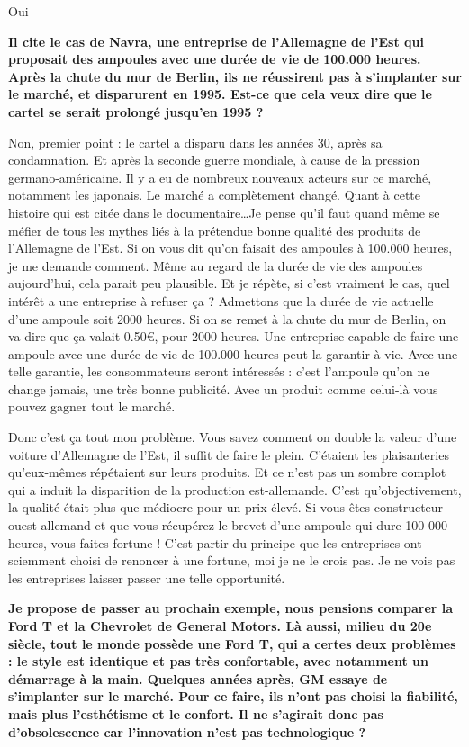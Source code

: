 \begin{small}
Oui

\textbf{Il cite le cas de \og   Navra\fg{}, une entreprise de l'Allemagne de l'Est qui proposait des ampoules avec une durée de vie de 100.000 heures. Après la chute du mur de Berlin, ils ne réussirent pas à s'implanter sur le marché, et disparurent en 1995. Est-ce que cela veux dire que le cartel se serait prolongé jusqu'en 1995 ?}
\smallbreak


Non, premier point : le cartel a disparu dans les années 30, après sa condamnation. Et après la seconde guerre mondiale, à cause de la pression germano-américaine. Il y a eu de nombreux nouveaux acteurs sur ce marché, notamment les japonais. Le marché a complètement changé.
Quant à cette histoire qui est citée dans le documentaire\dots  Je pense qu'il faut quand même se méfier de tous les mythes liés à la prétendue bonne qualité des produits de l'Allemagne de l'Est.
Si on vous dit qu'on faisait des ampoules à 100.000 heures, je me demande comment. Même au regard de la durée de vie des ampoules aujourd'hui, cela parait peu plausible.
Et je répète, si c'est vraiment le cas, quel intérêt a une entreprise à refuser ça ?
Admettons que la durée de vie actuelle d'une ampoule soit 2000 heures. Si on se remet à la chute du mur de Berlin, on va dire que ça valait 0.50\euro, pour 2000 heures.
Une entreprise capable de faire une ampoule avec une durée de vie de 100.000 heures peut la garantir à vie. Avec une telle garantie, les consommateurs seront intéressés : c'est l'ampoule qu'on ne change jamais, une très bonne publicité.
Avec un produit comme celui-là vous pouvez gagner tout le marché.

Donc c'est ça tout mon problème. Vous savez comment on double la valeur d'une voiture d'Allemagne de l'Est, il suffit de faire le plein. C'étaient les plaisanteries qu'eux-mêmes répétaient sur leurs produits. Et ce n'est pas un sombre complot qui a induit la disparition de la production est-allemande. C'est qu'objectivement, la qualité était plus que médiocre pour un prix élevé. Si vous êtes constructeur ouest-allemand et que vous récupérez le brevet d'une ampoule qui dure 100 000 heures, vous faites fortune !
C'est partir du principe que les entreprises ont sciemment choisi de renoncer à une fortune, moi je ne le crois pas. Je ne vois pas les entreprises laisser passer une telle opportunité.

\textbf{Je propose de passer au prochain exemple, nous pensions comparer la Ford T et la Chevrolet de General Motors. Là aussi, milieu du 20e siècle, tout le monde possède une Ford T, qui a certes deux problèmes : le style  est identique et pas très confortable, avec notamment un démarrage à la main. Quelques années après, GM essaye de s'implanter sur le marché. Pour ce faire, ils n'ont pas choisi la fiabilité, mais plus l'esthétisme et le confort. Il ne s'agirait donc pas d'obsolescence car l'innovation n'est pas technologique ?}
\smallbreak



\end{small}
